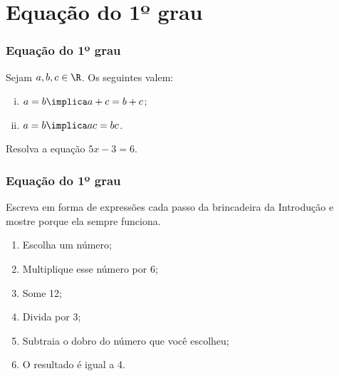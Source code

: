 
\section{Equação do 1º grau}



\begin{frame}
\frametitle{Equação do 1º grau} 

\begin{proposicao}[Propriedades]
	Sejam $a, b, c \in \R$. Os seguintes valem:
	\begin{enumerate}[i.]
		\item $a=b \implica a+c = b+c$;
		\item $a=b \implica ac = bc$.
	\end{enumerate}
\end{proposicao}\pause


\begin{exemplo}
Resolva a equação $5x - 3 = 6$.
\end{exemplo}

\end{frame}




\begin{frame}
	\frametitle{Equação do 1º grau}

\begin{exemplo}
	Escreva em forma de expressões cada passo da brincadeira da
	Introdução e mostre porque ela sempre funciona.
	\begin{enumerate}
		\item Escolha um número;
		\item Multiplique esse número por 6;
		\item Some 12;
		\item Divida por 3;
		\item Subtraia o dobro do número que você escolheu;
		\item O resultado é igual a 4.
	\end{enumerate}
	\end{exemplo}

\end{frame}

